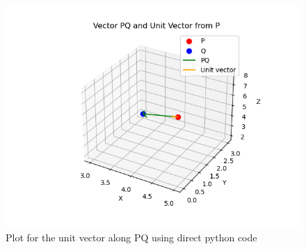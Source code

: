 \documentclass[journal]{IEEEtran}
\begin{document}
         \begin{figure}
             \centering
             \includegraphics[width=1\columnwidth]{figs/Figure2.png}
             \caption{Plot for the unit vector along PQ using direct python code }
             \label{fig:fig21}
         \end{figure}
         
\end{document}
